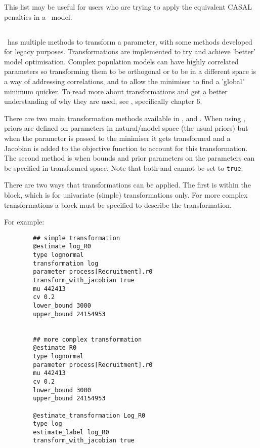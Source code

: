 This list may be useful for users who are trying to apply the equivalent CASAL penalties in a \CNAME\ model.

\subsection{\label{sec:transformations}}

\CNAME\ has multiple methods to transform a parameter, with some methods developed for legacy purposes. Transformations are implemented to try and achieve 'better' model optimisation. Complex population models can have highly correlated parameters so transforming them to be orthogonal or to be in a different space is a way of addressing correlations, and to allow the minimiser to find a 'global' minimum quicker. To read more about transformations and get a better understanding of why they are used, see \cite{gilks1995markov}, specifically chapter 6.

There are two main transformation methods available in \CNAME,  and . When using , priors are defined on parameters in natural/model space (the usual priors) but when the parameter is passed to the minimiser it gets transformed and a Jacobian is added to the objective function to account for this transformation. The second method is when bounds and prior parameters on the parameters can be specified in transformed space. Note that both  and  cannot be set to \texttt{true}.

There are two ways that transformations can be applied. The first is within the  block, which is for univariate (simple) transformations only. For more complex transformations a  block must be specified to describe the transformation.

For example:

{\small{\begin{verbatim}
		## simple transformation
		@estimate log_R0
		type lognormal
		transformation log
		parameter process[Recruitment].r0
		transform_with_jacobian true
		mu 442413
		cv 0.2
		lower_bound 3000
		upper_bound 24154953


		## more complex transformation
		@estimate R0
		type lognormal
		parameter process[Recruitment].r0
		mu 442413
		cv 0.2
		lower_bound 3000
		upper_bound 24154953

		@estimate_transformation Log_R0
		type log
		estimate_label log_R0
		transform_with_jacobian true
		\end{verbatim}}}

